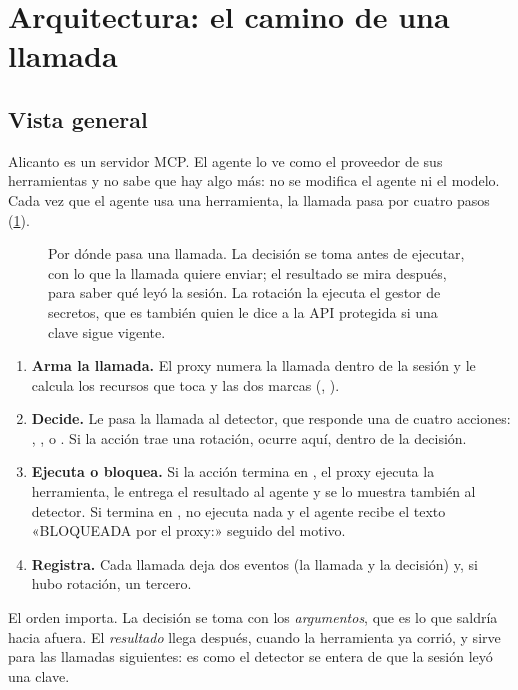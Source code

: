\section{Arquitectura: el camino de una llamada}\label{sec:arquitectura}

\subsection{Vista general}

Alicanto es un servidor MCP. El agente lo ve como el proveedor de sus herramientas y no sabe que hay
algo más: no se modifica el agente ni el modelo. Cada vez que el agente usa una herramienta, la
llamada pasa por cuatro pasos (\cref{fig:arquitectura}).

\begin{figure}[ht]
\centering

\caption{Por dónde pasa una llamada. La decisión se toma antes de ejecutar, con lo que la llamada
quiere enviar; el resultado se mira después, para saber qué leyó la sesión. La rotación la ejecuta el
gestor de secretos, que es también quien le dice a la API protegida si una clave sigue vigente.}
\label{fig:arquitectura}
\end{figure}

\begin{enumerate}
  \item \textbf{Arma la llamada.} El proxy numera la llamada dentro de la sesión y le calcula los
    recursos que toca y las dos marcas (, ).
  \item \textbf{Decide.} Le pasa la llamada al detector, que responde una de cuatro acciones:
    , ,  o . Si la acción trae una
    rotación, ocurre aquí, dentro de la decisión.
  \item \textbf{Ejecuta o bloquea.} Si la acción termina en , el proxy ejecuta la
    herramienta, le entrega el resultado al agente y se lo muestra también al detector. Si termina en
    , no ejecuta nada y el agente recibe el texto «BLOQUEADA por el proxy:» seguido del
    motivo.
  \item \textbf{Registra.} Cada llamada deja dos eventos (la llamada y la decisión) y, si hubo
    rotación, un tercero.
\end{enumerate}

El orden importa. La decisión se toma con los \emph{argumentos}, que es lo que saldría hacia afuera.
El \emph{resultado} llega después, cuando la herramienta ya corrió, y sirve para las llamadas
siguientes: es como el detector se entera de que la sesión leyó una clave.

